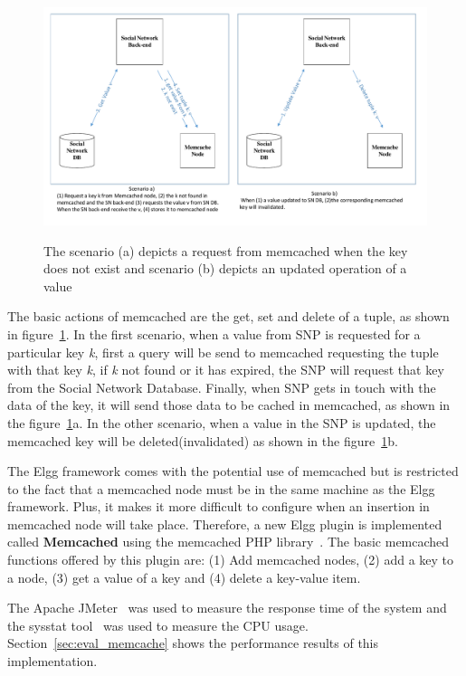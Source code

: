\begin{figure}[h]
	\caption{The scenario (a) depicts a request from memcached when the key does not exist and scenario (b) depicts an updated operation of a value}
	\includegraphics[width=1\textwidth]{./fig/memcached_key_value.pdf}
	\centering
	\label{fig:memcache_key_value}
\end{figure}

The basic actions of memcached are the get, set and delete of a tuple, as shown in figure~\ref{fig:memcache_key_value}. In the first scenario, when a value from SNP is requested for a particular key {\it k}, first a query will be send to memcached requesting the tuple with that key {\it k}, if {\it k} not found or it has expired, the SNP will request that key from the Social Network Database. Finally, when SNP gets in touch with the data of the key, it will send those data to be cached in memcached, as shown in the figure~\ref{fig:memcache_key_value}a. In the other scenario, when a value in the SNP is updated, the memcached key will be deleted(invalidated) as shown in the figure~\ref{fig:memcache_key_value}b.

The Elgg framework comes with the potential use of memcached but is restricted to the fact that a memcached node must be in the same machine as the Elgg framework. Plus, it makes it more difficult to configure when an insertion in memcached node will take place. Therefore, a new Elgg plugin is implemented called \textbf{Memcached} using the memcached PHP library~\cite{memcached_php_doc}. The basic memcached functions offered by this plugin are: (1) Add memcached nodes, (2) add a key to a node, (3) get a value of a key and (4) delete a key-value item. 

The Apache JMeter~\cite{jmeter_url} was used to measure the response time of the system and the sysstat tool~\cite{sysstat_url} was used to measure the CPU usage. Section~\ref{sec:eval_memcache} 
 shows the performance results of this implementation.

